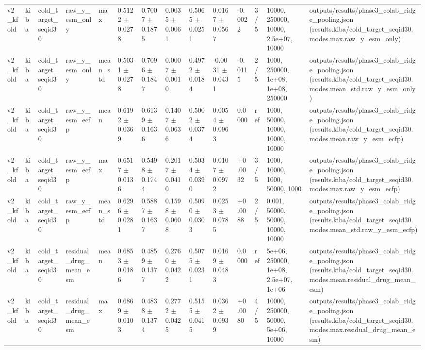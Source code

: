 \begin{table}[htbp]
\begin{tabular}{llllllllllllll}
v2\_kfold & kiba & cold\_target\_seqid30 & raw\_y\_esm\_only & max & 0.5122 $\pm$ 0.0278 & 0.7007 $\pm$ 0.1875 & 0.0035 $\pm$ 0.0061 & 0.5065 $\pm$ 0.0251 & 0.0167 $\pm$ 0.0567 & -0.0022 & 3/5 & 10000, 250000, 10000, 2.5e+07, 10000 & outputs/results/phase3\_colab\_ridge\_pooling.json (results.kiba/cold\_target\_seqid30.modes.max.raw\_y\_esm\_only) \\
v2\_kfold & kiba & cold\_target\_seqid30 & raw\_y\_esm\_only & mean\_std & 0.5031 $\pm$ 0.0278 & 0.7096 $\pm$ 0.1847 & 0.0007 $\pm$ 0.0010 & 0.4972 $\pm$ 0.0184 & -0.0031 $\pm$ 0.0431 & -0.0115 & 2/5 & 1000, 250000, 1e+08, 1e+08, 250000 & outputs/results/phase3\_colab\_ridge\_pooling.json (results.kiba/cold\_target\_seqid30.modes.mean\_std.raw\_y\_esm\_only) \\
v2\_kfold & kiba & cold\_target\_seqid30 & raw\_y\_esm\_ecfp & mean & 0.6192 $\pm$ 0.0369 & 0.6139 $\pm$ 0.1636 & 0.1407 $\pm$ 0.0636 & 0.5002 $\pm$ 0.0374 & 0.0054 $\pm$ 0.0963 & 0.0000 & ref & 1000, 50000, 10000, 10000, 10000 & outputs/results/phase3\_colab\_ridge\_pooling.json (results.kiba/cold\_target\_seqid30.modes.mean.raw\_y\_esm\_ecfp) \\
v2\_kfold & kiba & cold\_target\_seqid30 & raw\_y\_esm\_ecfp & max & 0.6517 $\pm$ 0.0136 & 0.5498 $\pm$ 0.1744 & 0.2017 $\pm$ 0.0410 & 0.5034 $\pm$ 0.0390 & 0.0107 $\pm$ 0.0972 & +0.0032 & 3/5 & 1000, 10000, 1000, 50000, 1000 & outputs/results/phase3\_colab\_ridge\_pooling.json (results.kiba/cold\_target\_seqid30.modes.max.raw\_y\_esm\_ecfp) \\
v2\_kfold & kiba & cold\_target\_seqid30 & raw\_y\_esm\_ecfp & mean\_std & 0.6296 $\pm$ 0.0281 & 0.5887 $\pm$ 0.1637 & 0.1598 $\pm$ 0.0608 & 0.5090 $\pm$ 0.0303 & 0.0253 $\pm$ 0.0785 & +0.0088 & 2/5 & 0.001, 50000, 50000, 10000, 10000 & outputs/results/phase3\_colab\_ridge\_pooling.json (results.kiba/cold\_target\_seqid30.modes.mean\_std.raw\_y\_esm\_ecfp) \\
v2\_kfold & kiba & cold\_target\_seqid30 & residual\_drug\_mean\_esm & mean & 0.6853 $\pm$ 0.0186 & 0.4859 $\pm$ 0.1377 & 0.2760 $\pm$ 0.0422 & 0.5075 $\pm$ 0.0231 & 0.0169 $\pm$ 0.0483 & 0.0000 & ref & 5e+06, 250000, 1e+08, 2.5e+07, 1e+06 & outputs/results/phase3\_colab\_ridge\_pooling.json (results.kiba/cold\_target\_seqid30.modes.mean.residual\_drug\_mean\_esm) \\
v2\_kfold & kiba & cold\_target\_seqid30 & residual\_drug\_mean\_esm & max & 0.6869 $\pm$ 0.0103 & 0.4838 $\pm$ 0.1374 & 0.2772 $\pm$ 0.0425 & 0.5155 $\pm$ 0.0415 & 0.0362 $\pm$ 0.0939 & +0.0080 & 4/5 & 10000, 250000, 50000, 5e+06, 10000 & outputs/results/phase3\_colab\_ridge\_pooling.json (results.kiba/cold\_target\_seqid30.modes.max.residual\_drug\_mean\_esm) \\

\end{tabular}
\end{table}
